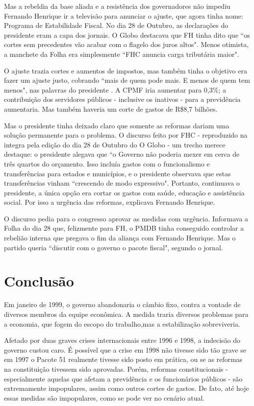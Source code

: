 \documentclass{article}
\begin{document}
Mas a rebeldia da base aliada e a resistência dos governadores não impediu Fernando Henrique ir a televisão para anunciar o ajuste, que agora tinha nome: Programa de Estabilidade Fiscal. No dia 28 de Outubro, as declarações do presidente eram a capa dos jornais. O Globo destacava que FH tinha dito que ``os cortes sem precedentes vão acabar com o flagelo dos juros altos". Menos otimista, a manchete da Folha era simplesmente ``FHC anuncia carga tributária maior".

O ajuste trazia cortes e aumentos de impostos, mas também tinha o objetivo era fazer um ajuste justo, cobrando ``mais de quem pode mais. E menos de quem tem menos", nas palavras do presidente . A CPMF iria aumentar para 0,3\%; a contribuição dos servidores públicos - inclusive os inativos - para a previdência aumentaria. Mas também haveria um corte de gastos de R\$8,7 bilhões. 

Mas o presidente tinha deixado claro que somente as reformas dariam uma solução permanente para o problema. O discurso feito por FHC - reproduzido na integra pela edição do dia 28 de Outubro do O Globo - um trecho merece destaque: o presidente alegava que ``o Governo não poderia mexer em cerca de três quartos do orçamento. Isso incluía gastos com o funcionalismo e transferências para estados e municípios, e o presidente observava que estas transferências vinham ``crescendo de modo expressivo". Portanto, continuava o presidente, a única opção era cortar os gastos com saúde, educação e assistência social. Por isso a urgência das reformas, explicava Fernando Henrique. 

O discurso pedia para o congresso aprovar as medidas com urgência. Informava a Folha do dia 28 que, felizmente para FH, o PMDB tinha conseguido controlar a rebelião interna que pregava o fim da aliança com Fernando Henrique. Mas o partido queria ``discutir com o governo o pacote fiscal", segundo o jornal.             

 
 
\section{Conclusão}

Em janeiro de 1999, o governo abandonaria o câmbio fixo, contra a vontade de diversos membros da equipe econômica. A medida traria diversos problemas para a economia, que fogem do escopo do trabalho,mas a estabilização sobreviveria.

Afetado por duas graves crises internacionais entre 1996 e 1998, a indecisão do governo custou caro. É possível que a crise em 1998 não tivesse sido tão grave se em 1997 o Pacote 51 realmente tivesse sido posto em prática, ou se as reformas na constituição tivessem sido aprovadas. Porém, reformas constitucionais - especialmente aquelas que afetam a previdência e os funcionários públicos - são extremamente impopulares, assim como outros cortes de gastos. De fato, até hoje essas medidas são impopulares, como se pode ver no cenário atual.
\end{document}
